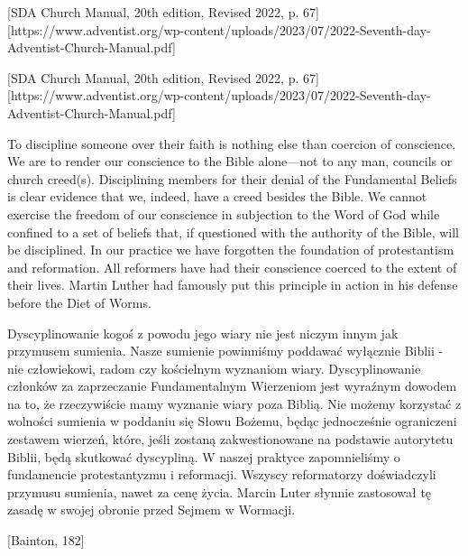 



[SDA Church Manual, 20th edition, Revised 2022, p. 67][https://www.adventist.org/wp-content/uploads/2023/07/2022-Seventh-day-Adventist-Church-Manual.pdf]


[SDA Church Manual, 20th edition, Revised 2022, p. 67][https://www.adventist.org/wp-content/uploads/2023/07/2022-Seventh-day-Adventist-Church-Manual.pdf]


To discipline someone over their faith is nothing else than coercion of conscience. We are to render our conscience to the Bible alone—not to any man, councils or church creed(s). Disciplining members for their denial of the Fundamental Beliefs is clear evidence that we, indeed, have a creed besides the Bible. We cannot exercise the freedom of our conscience in subjection to the Word of God while confined to a set of beliefs that, if questioned with the authority of the Bible, will be disciplined. In our practice we have forgotten the foundation of protestantism and reformation. All reformers have had their conscience coerced to the extent of their lives. Martin Luther had famously put this principle in action in his defense before the Diet of Worms.


Dyscyplinowanie kogoś z powodu jego wiary nie jest niczym innym jak przymusem sumienia. Nasze sumienie powinniśmy poddawać wyłącznie Biblii - nie człowiekowi, radom czy kościelnym wyznaniom wiary. Dyscyplinowanie członków za zaprzeczanie Fundamentalnym Wierzeniom jest wyraźnym dowodem na to, że rzeczywiście mamy wyznanie wiary poza Biblią. Nie możemy korzystać z wolności sumienia w poddaniu się Słowu Bożemu, będąc jednocześnie ograniczeni zestawem wierzeń, które, jeśli zostaną zakwestionowane na podstawie autorytetu Biblii, będą skutkować dyscypliną. W naszej praktyce zapomnieliśmy o fundamencie protestantyzmu i reformacji. Wszyscy reformatorzy doświadczyli przymusu sumienia, nawet za cenę życia. Marcin Luter słynnie zastosował tę zasadę w swojej obronie przed Sejmem w Wormacji.


[Bainton, 182]


